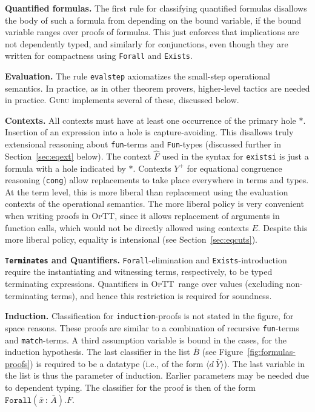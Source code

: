 \documentclass[preprint,natbib]{sigplanconf}
\newcommand{\optt}{\textsc{OpTT}}
\begin{document}
\textbf{Quantified formulas.} The first rule for classifying
quantified formulas disallows the body of such a formula from
depending on the bound variable, if the bound variable ranges over
proofs of formulas.  This just enforces that implications are not
dependently typed, and similarly for conjunctions, even though they
are written for compactness using \texttt{Forall} and \texttt{Exists}.

\textbf{Evaluation.} The rule \texttt{evalstep} axiomatizes the
small-step operational semantics.  In practice, as in other theorem
provers, higher-level tactics are needed in practice.  \textsc{Guru}
implements several of these, discussed below.

\textbf{Contexts.} All contexts must have at least one occurrence of
the primary hole $*$.  Insertion of an expression into a hole is
capture-avoiding.  This disallows truly extensional reasoning about
\texttt{fun}-terms and \texttt{Fun}-types (discussed further in
Section~\ref{sec:eqext} below).  The context $\hat{F}$ used in the
syntax for \texttt{existsi} is just a formula with a hole indicated by
$*$.  Contexts $Y^+$ for equational congruence reasoning
(\texttt{cong}) allow replacements to take place everywhere in terms
and types.  At the term level, this is more liberal than replacement
using the evaluation contexts of the operational semantics.  The more
liberal policy is very convenient when writing proofs in \optt, since
it allows replacement of arguments in function calls, which would not
be directly allowed using contexts $E$.  Despite this more liberal
policy, equality is intensional (see Section~\ref{sec:eqcuts}).

\textbf{\texttt{Terminates} and Quantifiers.} \texttt{Forall}-elimination
and \texttt{Exists}-introduction require the instantiating and
witnessing terms, respectively, to be typed terminating expressions.
Quantifiers in \optt\ range over values (excluding non-terminating
terms), and hence this restriction is required for soundness.

\textbf{Induction.} Classification for \texttt{induction}-proofs is
not stated in the figure, for space reasons.  These proofs are similar
to a combination of recursive \texttt{fun}-terms and
\texttt{match}-terms.  A third assumption variable is bound in the
cases, for the induction hypothesis.  The last classifier in the list
$\bar{B}$ (see Figure~\ref{fig:formulas-proofs}) is required to be a
datatype (i.e., of the form $\langle d\ \bar{Y}\rangle$).  The last
variable in the list is thus the parameter of induction.  Earlier
parameters may be needed due to dependent typing.  The classifier for
the proof is then of the form $\texttt{Forall}(\bar{x}\,:\,\bar{A}). F$.
\end{document}
